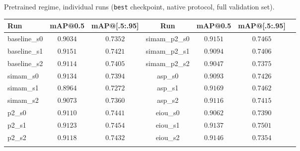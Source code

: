\documentclass[pdflatex,sn-basic,Numbered]{sn-jnl}%
\begin{document}
\begin{appendices}
\begin{center}
\makeatletter{}\makeatother
\caption{Pretrained regime, individual runs (\texttt{best} checkpoint, native protocol, full validation set).}\label{tab:perrun}%
\tablebodyfont
\begin{tabular}{@{}lcccccc@{}}
\toprule
Run & mAP@0.5 & mAP@[.5:.95] & Run & mAP@0.5 & mAP@[.5:.95]\\
\midrule
baseline\_s0 & $0.9034$ & $0.7352$ & simam\_p2\_s0 & $0.9151$ & $0.7465$\\
baseline\_s1 & $0.9151$ & $0.7421$ & simam\_p2\_s1 & $0.9094$ & $0.7406$\\
baseline\_s2 & $0.9114$ & $0.7405$ & simam\_p2\_s2 & $0.9047$ & $0.7375$\\
simam\_s0 & $0.9134$ & $0.7394$ & asp\_s0 & $0.9093$ & $0.7426$\\
simam\_s1 & $0.8964$ & $0.7272$ & asp\_s1 & $0.9169$ & $0.7462$\\
simam\_s2 & $0.9073$ & $0.7360$ & asp\_s2 & $0.9116$ & $0.7415$\\
p2\_s0 & $0.9110$ & $0.7441$ & eiou\_s0 & $0.9062$ & $0.7390$\\
p2\_s1 & $0.9123$ & $0.7454$ & eiou\_s1 & $0.9137$ & $0.7501$\\
p2\_s2 & $0.9118$ & $0.7432$ & eiou\_s2 & $0.9146$ & $0.7354$\\
\botrule
\end{tabular}
\end{center}

\end{appendices}

\end{document}
